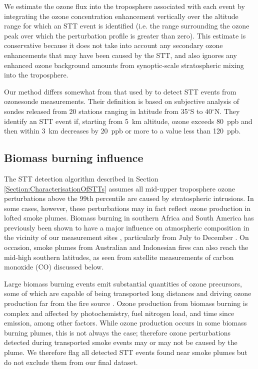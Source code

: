 \documentclass{article}
\begin{document}
    We estimate the ozone flux into the troposphere associated with each event by integrating the ozone concentration enhancement vertically over the altitude range for which an STT event is identified (i.e. the range surrounding the ozone peak over which the perturbation profile is greater than zero).
    This estimate is conservative because it does not take into account any secondary ozone enhancements that may have been caused by the STT, and also ignores any enhanced ozone background amounts from synoptic-scale stratospheric mixing into the troposphere.
    
    Our method differs somewhat from that used by \citet{Tang2010} to detect STT events from ozonesonde measurements. 
    Their definition is based on subjective analysis of sondes released from 20 stations ranging in latitude from 35$^\circ$S to 40$^\circ$N.
    They identify an STT event if, starting from 5~km altitude, ozone exceeds 80~ppb and then within 3~km decreases by 20~ppb or more to a value less than 120~ppb.

  \subsection{Biomass burning influence}
  \label{Section:BiomassBurning}
    The STT detection algorithm described in Section \ref{Section:CharacterisationOfSTTs} assumes all mid-upper troposphere ozone perturbations above the 99th percentile are caused by stratospheric intrusions. 
    In some cases, however, these perturbations may in fact reflect ozone production in lofted smoke plumes.
    Biomass burning in southern Africa and South America has previously been shown to have a major influence on atmospheric composition in the vicinity of our measurement sites \citep{Oltmans2001, Gloudemans2006, Edwards2006}, particularly from July to December \citep{Pak2003, Liu2016}.
    On occasion, smoke plumes from Australian and Indonesian fires can also reach the mid-high southern latitudes, as seen from satellite measurements of carbon monoxide (CO) discussed below. %
    
    Large biomass burning events emit substantial quantities of ozone precursors, some of which are capable of being transported long distances and driving ozone production far from the fire source \citep{Jaffe_2012}.
    Ozone production from biomass burning is complex and affected by photochemistry, fuel nitrogen load, and time since emission, among other factors. 
    While ozone production occurs in some biomass burning plumes, this is not always the case; therefore ozone perturbations detected during transported smoke events may or may not be caused by the plume.
    We therefore flag all detected STT events found near smoke plumes but do not exclude them from our final dataset.
    
\end{document}

